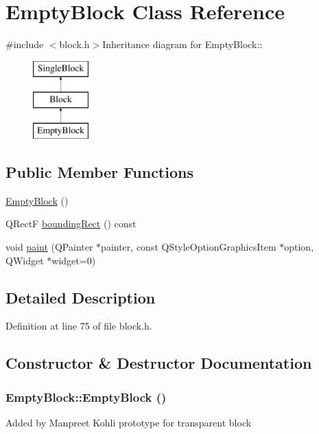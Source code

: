 \hypertarget{class_empty_block}{
\section{EmptyBlock Class Reference}
\label{class_empty_block}
}


{\ttfamily \#include $<$block.h$>$}Inheritance diagram for EmptyBlock::\begin{figure}[H]
\begin{center}
\leavevmode
\includegraphics[height=3cm]{class_empty_block}
\end{center}
\end{figure}
\subsection*{Public Member Functions}
\begin{DoxyCompactItemize}
\item 
\hyperlink{class_empty_block_a403cf9179dfc9ccb831700c1c1ce7b34}{EmptyBlock} ()
\item 
QRectF \hyperlink{class_empty_block_a1984fabb510aba7e14f460845faf881c}{boundingRect} () const 
\item 
void \hyperlink{class_empty_block_a1cec09fdef31d4404857dd22151a1834}{paint} (QPainter $\ast$painter, const QStyleOptionGraphicsItem $\ast$option, QWidget $\ast$widget=0)
\end{DoxyCompactItemize}


\subsection{Detailed Description}


Definition at line 75 of file block.h.

\subsection{Constructor \& Destructor Documentation}
\hypertarget{class_empty_block_a403cf9179dfc9ccb831700c1c1ce7b34}{
\subsubsection[{EmptyBlock}]{\setlength{\rightskip}{0pt plus 5cm}EmptyBlock::EmptyBlock ()}}
\label{class_empty_block_a403cf9179dfc9ccb831700c1c1ce7b34}
Added by Manpreet Kohli prototype for transparent block 

